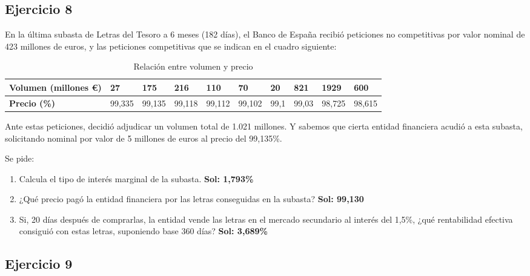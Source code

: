 \subsection*{Ejercicio 8}

En la última subasta de Letras del Tesoro a 6 meses (182 días), el Banco de España recibió peticiones no competitivas por valor nominal de 423 millones de euros, y las peticiones competitivas que se indican en el cuadro siguiente:

\begin{table}[h]
    \centering
    \renewcommand{\arraystretch}{1.2}
    \begin{tabular}{|p{2cm}|p{1cm}|p{1cm}|p{1cm}|p{1cm}|p{1cm}|p{1cm}|p{1cm}|p{1cm}|p{1cm}|}
        \hline
        \textbf{Volumen (millones €)} & 27 & 175 & 216 & 110 & 70 & 20 & 821 & 1929 & 600 \\
        \hline
        \textbf{Precio (\%)} & 99,335 & 99,135 & 99,118 & 99,112 & 99,102 & 99,1 & 99,03 & 98,725 & 98,615 \\
        \hline
    \end{tabular}
    \caption{Relación entre volumen y precio}
    \label{tab:volumen_precio}
\end{table}


Ante estas peticiones, decidió adjudicar un volumen total de 1.021 millones. Y sabemos que cierta entidad financiera acudió a esta subasta, solicitando nominal por valor de 5 millones de euros al precio del 99,135\%.

Se pide:

\begin{enumerate}[label=\textbf{\alph*)}]
    \item Calcula el tipo de interés marginal de la subasta. \textbf{Sol: 1,793\%}
    
    

    

    \item ¿Qué precio pagó la entidad financiera por las letras conseguidas en la subasta? \textbf{Sol: 99,130}
    \item Si, 20 días después de comprarlas, la entidad vende las letras en el mercado secundario al interés del 1,5\%, ¿qué rentabilidad efectiva consiguió con estas letras, suponiendo base 360 días? \textbf{Sol: 3,689\%}
\end{enumerate}

\subsection*{Ejercicio 9}

